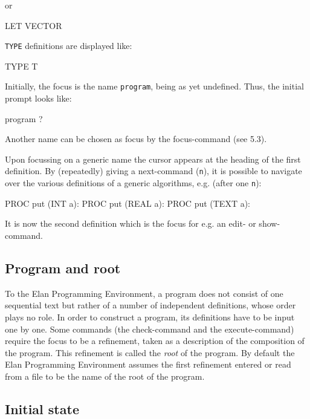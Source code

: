 \noindent
or

\begin{elan}
        LET VECTOR\cursor
\end{elan}

{\tt TYPE} definitions are displayed like:

\begin{elan}
        TYPE T\cursor
\end{elan}

Initially, the focus is the name {\tt program}, being as yet
undefined. Thus, the initial prompt looks like:

\begin{elan}
        program ?\cursor 
\end{elan}

\noindent
Another name can be chosen as focus by the focus-command (see 5.3).

Upon focussing on a generic name the cursor appears at the heading
of the first definition.
By (repeatedly) giving a next-command ({\tt n}), it is possible to
navigate over the various definitions of a generic algorithms, e.g.
(after one {\tt n}):

\begin{elan}
        PROC put (INT a):
        PROC put (REAL a):\cursor
        PROC put (TEXT a):
\end{elan}

\noindent
It is now the second definition which is the focus for e.g. an
edit- or show-command.

\subsection{Program and root}

To the Elan Programming Environment, a program does not consist
of one sequential text but rather of a number of independent
definitions, whose order plays no role. In order to construct
a program, its definitions have to be input one by one. Some
commands (the check-command and the execute-command) require
the focus to be a refinement, taken as a description of the composition
of the program. This refinement is called the {\em root }of the
program. By default the Elan Programming Environment assumes
the first refinement entered or read from a file to be the name
of the root of the program.

\subsection{Initial state}

